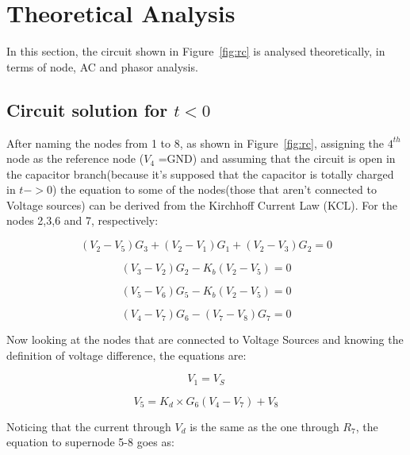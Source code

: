 \section{Theoretical Analysis}
\label{sec:analysis}

In this section, the circuit shown in Figure~\ref{fig:rc} is analysed
theoretically, in terms of node, AC and phasor analysis.

\subsection{Circuit solution for $t<0$}

After naming the nodes from 1 to 8, as shown in Figure~\ref{fig:rc}, assigning the $4^{th}$ node as the reference node ($V_{4}$ =GND) and assuming that the circuit is open in the capacitor branch(because it's supposed that the capacitor is totally charged in $t->0$) the equation to some of the nodes(those that aren't connected to Voltage sources) can be derived from the  Kirchhoff Current Law (KCL).
For the nodes 2,3,6 and 7, respectively:

\begin{equation}
  (V_2-V_5)G_3 + (V_2-V_1)G_1 + (V_2-V_3)G_2 = 0
  \label{eq:Node2}
\end{equation}

\begin{equation}
  (V_3-V_2)G_2 - K_b(V_2-V_5)= 0
  \label{eq:Node3}
\end{equation}

\begin{equation}
  (V_5-V_6)G_5 - K_b(V_2-V_5) = 0
  \label{eq:Node6}
\end{equation}

\begin{equation}
  (V_4-V_7)G_6 - (V_7-V_8)G_7 = 0
  \label{eq:Node7}
\end{equation}

Now looking at the nodes that are connected to Voltage Sources and knowing the definition of voltage difference, the equations are:

\begin{equation}
  V_1 = V_S
  \label{eq:Node1}
\end{equation}

\begin{equation}
  V_5= K_d \times G_6(V_4-V_7) + V_8
  \label{eq:Node8}
\end{equation}

Noticing that the current through $V_d$ is the same as the one through $R_7$, the equation to supernode 5-8 goes as:

